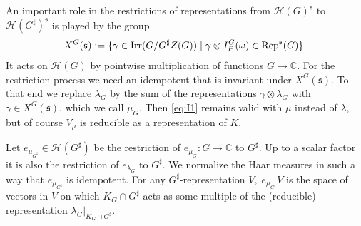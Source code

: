 \documentclass[11pt]{amsart}
\theoremstyle{definition}
\begin{document}
An important role in the restrictions of representations from ${{\mathcal H}} (G)^{{\mathfrak s}}$ to
${{\mathcal H}} (G^\sharp)^{{\mathfrak s}}$ is played by the group
\begin{align*}
X^G ({{\mathfrak s}}) := \{ \gamma \in {{\rm Irr}} (G / G^\sharp Z(G)) \mid \gamma \otimes I_P^G (\omega)
\in {{\rm Rep}}^{{\mathfrak s}} (G) \} .
\end{align*}
It acts on ${{\mathcal H}} (G)$ by pointwise multiplication of functions $G \to {\mathbb C}$. 
For the restriction process we need an idempotent that is invariant under 
$X^G ({{\mathfrak s}})$. To that end we replace $\lambda_G$ by the sum of the representations 
$\gamma \otimes \lambda_G$ with $\gamma \in X^G ({{\mathfrak s}})$, which we call $\mu_G$. 
Then \eqref{eq:I1} remains valid with $\mu$ instead of $\lambda$, but of course
$V_\mu$ is reducible as a representation of $K$. 

Let $e_{\mu_{G^\sharp}} \in {{\mathcal H}} (G^\sharp)$ be the restriction of $e_{\mu_G} :
G \to {\mathbb C}$ to $G^\sharp$. Up to a scalar factor it is also the restriction of
$e_{\lambda_G}$ to $G^\sharp$. We normalize the Haar measures in such a way that
$e_{\mu_{G^\sharp}}$ is idempotent. For any $G^\sharp$-representation $V ,\;
e_{\mu_{G^\sharp}} V$ is the space of vectors in $V$ on which $K_G \cap G^\sharp$
acts as some multiple of the (reducible) representation $\lambda_G 
|_{K_G \cap G^\sharp}$. 
\end{document}
